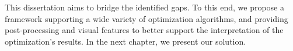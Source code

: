 	This dissertation aims to bridge the identified gaps. To this end, we propose a framework supporting a wide variety of optimization algorithms, and providing post-processing and visual features to better support the interpretation of the optimization's results. In the next chapter, we present our solution.	
	
		